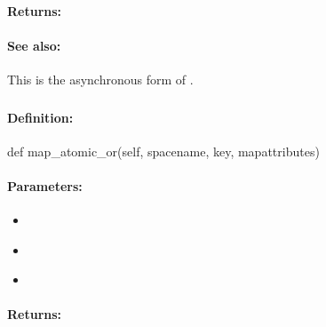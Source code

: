 \paragraph{Returns:}


\paragraph{See also:}  This is the asynchronous form of .

\pagebreak
\subsubsection{}
\label{api:python:map_atomic_or}


\paragraph{Definition:}
\begin{pythoncode}
def map_atomic_or(self, spacename, key, mapattributes)
\end{pythoncode}

\paragraph{Parameters:}
\begin{itemize}[noitemsep]
\item {}\\

\item {}\\

\item {}\\

\end{itemize}

\paragraph{Returns:}


\pagebreak
\subsubsection{}
\label{api:python:async_map_atomic_or}


